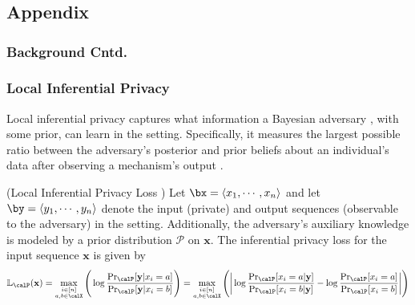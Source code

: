 

\graphicspath{{./chapters/chapter4/}}
\chapter{ }


\section{Appendix}\label{app}
\subsection{Background Cntd.}\label{app:background}

\subsection{Local Inferential Privacy}  \vspace{-0.2cm}
Local inferential privacy captures what information a Bayesian adversary \cite{Pufferfish}, with some prior, can learn in the \ldp setting. 
Specifically, it measures the largest possible ratio between the adversary's posterior and prior beliefs about an individual’s data after observing a mechanism's output .%
\begin{defn}(Local Inferential Privacy Loss \cite{Pufferfish}) Let $\bx=\langle x_1, \cdots, x_n\rangle$ and let $\by=\langle y_1, \cdots, y_n \rangle$ denote the input (private) and output sequences (observable to the adversary) in the \ldp setting. Additionally, the adversary's auxiliary knowledge is modeled by a prior distribution $\mathcal{P}$ on $\mathbf{x}$. The inferential privacy loss for the input sequence $\mathbf{x}$ is given by
\begin{equation}
\small \mathbb{L}_{\calP}(\mathbf{x})=\max_{\substack{i\in [n]\\ a,b \in \calX}}\Bigg(\log\frac{\mathrm{Pr}_{\calP}[\mathbf{y}|x_i=a]}{\mathrm{Pr}_{\calP}[\mathbf{y}|x_i=b]}\Bigg)
=\max_{\substack{i\in [n]\\ a,b \in \calX}}\Bigg (	\bigg| \log \frac{\mathrm{Pr}_{\calP}[x_i = a | \bf{y} ]}{\mathrm{Pr}_{\calP}[x_i = b | \bf{y}]}
	- \log \frac{\mathrm{Pr}_{\calP}[x_i = a]}{\mathrm{Pr}_{\calP}[x_i = b]} \bigg|\Bigg)
\end{equation}
\label{def:ip}
\vspace{-1em}
\end{defn}
